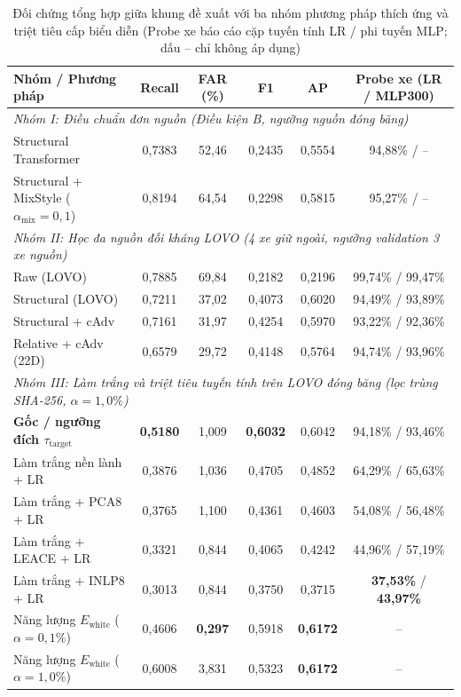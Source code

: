 \documentclass[12pt, a4paper, reqno, oneside]{book}
\begin{document}
\begin{table}[htbp]
  \centering
  \caption[Đối chứng tổng hợp với ba nhóm kỹ thuật thích ứng và triệt tiêu cấp biểu diễn]{Đối chứng tổng hợp giữa khung đề xuất với ba nhóm phương pháp thích ứng và triệt tiêu cấp biểu diễn (Probe xe báo cáo cặp tuyến tính LR / phi tuyến MLP; dấu -- chỉ không áp dụng)}
  \label{tab:adaptation-unified}
  \footnotesize
  \begin{tabular}{@{}l c c c c c@{}}
    \toprule
    \textbf{Nhóm / Phương pháp} & \textbf{Recall} & \textbf{FAR (\%)} & \textbf{F1} & \textbf{AP} & \textbf{Probe xe (LR / MLP300)} \\
    \midrule
    \multicolumn{6}{l}{\textit{Nhóm I: Điều chuẩn đơn nguồn (Điều kiện B, ngưỡng nguồn đóng băng)}} \\
    Structural Transformer & 0,7383 & 52,46 & 0,2435 & 0,5554 & 94,88\% / -- \\
    Structural + MixStyle ($\alpha_{\text{mix}}=0{,}1$) & 0,8194 & 64,54 & 0,2298 & 0,5815 & 95,27\% / -- \\
    \midrule
    \multicolumn{6}{l}{\textit{Nhóm II: Học đa nguồn đối kháng LOVO (4 xe giữ ngoài, ngưỡng validation 3 xe nguồn)}} \\
    Raw (LOVO) & 0,7885 & 69,84 & 0,2182 & 0,2196 & 99,74\% / 99,47\% \\
    Structural (LOVO) & 0,7211 & 37,02 & 0,4073 & 0,6020 & 94,49\% / 93,89\% \\
    Structural + cAdv & 0,7161 & 31,97 & 0,4254 & 0,5970 & 93,22\% / 92,36\% \\
    Relative + cAdv (22D) & 0,6579 & 29,72 & 0,4148 & 0,5764 & 94,74\% / 93,96\% \\
    \midrule
    \multicolumn{6}{l}{\textit{Nhóm III: Làm trắng và triệt tiêu tuyến tính trên LOVO đóng băng (lọc trùng SHA-256, $\alpha=1{,}0\%$)}} \\
    \textbf{Gốc / ngưỡng đích $\tau_{\text{target}}$} & \textbf{0,5180} & 1,009 & \textbf{0,6032} & 0,6042 & 94,18\% / 93,46\% \\
    Làm trắng nền lành + LR & 0,3876 & 1,036 & 0,4705 & 0,4852 & 64,29\% / 65,63\% \\
    Làm trắng + PCA8 + LR & 0,3765 & 1,100 & 0,4361 & 0,4603 & 54,08\% / 56,48\% \\
    Làm trắng + LEACE + LR & 0,3321 & 0,844 & 0,4065 & 0,4242 & 44,96\% / 57,19\% \\
    Làm trắng + INLP8 + LR & 0,3013 & 0,844 & 0,3750 & 0,3715 & \textbf{37,53\%} / \textbf{43,97\%} \\
    Năng lượng $E_{\text{white}}$ ($\alpha=0{,}1\%$) & 0,4606 & \textbf{0,297} & 0,5918 & \textbf{0,6172} & -- \\
    Năng lượng $E_{\text{white}}$ ($\alpha=1{,}0\%$) & 0,6008 & 3,831 & 0,5323 & \textbf{0,6172} & -- \\
    \bottomrule
  \end{tabular}
\end{table}
\end{document}
